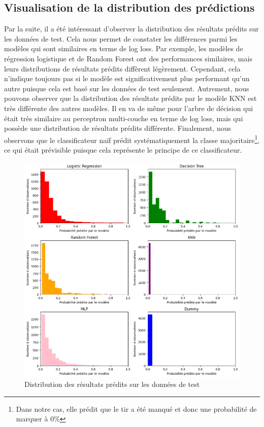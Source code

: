 \documentclass[12pt]{article}
\begin{document}
\subsection{Visualisation de la distribution des prédictions}
Par la suite, il a été intéressant d'observer la distribution des résultats prédits sur les données de test.
Cela nous permet de constater les différences parmi les modèles qui sont similaires en terme de log loss.
Par exemple, les modèles de régression logistique et de Random Forest ont des performances similaires, mais leurs distributions de résultats prédits diffèrent légèrement.
Cependant, cela n'indique toujours pas si le modèle est significativement plus performant qu'un autre puisque cela est basé sur les données de test seulement.
Autrement, nous pouvons observer que la distribution des résultats prédits par le modèle KNN est très différente des autres modèles.
Il en va de même pour l'arbre de décision qui était très similaire au perceptron multi-couche en terme de log loss, mais qui possède une distribution de résultats prédits différente.
\newline\newline
Finalement, nous observons que le classificateur naïf prédit systématiquement la classe majoritaire\footnote{Dans notre cas, elle prédit que le tir a été manqué et donc une probabilité de marquer à 0\%}, ce qui était prévisible puisque cela représente le principe de ce classificateur.
\begin{figure}[htp]
    \centering
    \includegraphics[width=\textwidth]{img/distributions_result_from_models.png}
    \caption{Distribution des résultats prédits sur les données de test}
    \label{fig:results}
\end{figure}
\end{document}
